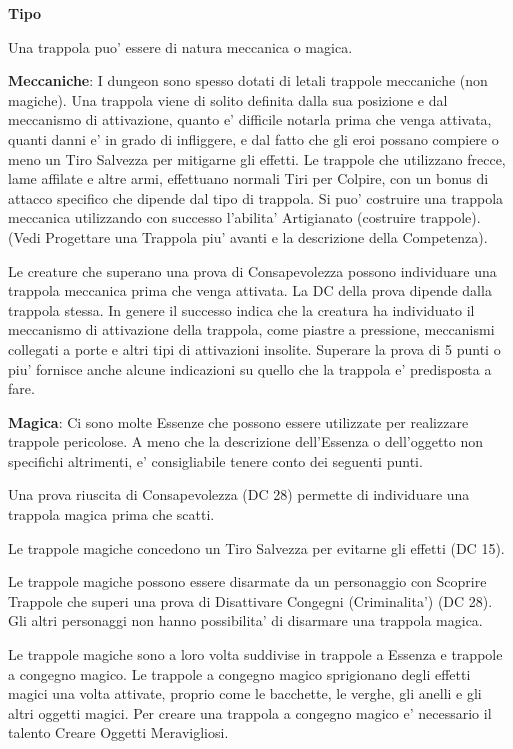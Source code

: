 \documentclass[a4paper,11pt,twoside,openany]{dndbook}
\begin{document}
{\textbf{Tipo}

Una trappola puo' essere di natura meccanica o magica.

\textbf{Meccaniche}: I dungeon sono spesso dotati di letali trappole meccaniche (non magiche). Una trappola viene di solito definita dalla sua posizione e dal meccanismo di attivazione, quanto e' difficile notarla prima che venga attivata, quanti danni e' in grado di infliggere, e dal fatto che gli eroi possano compiere o meno un Tiro Salvezza per mitigarne gli effetti. Le trappole che utilizzano frecce, lame affilate e altre armi, effettuano normali Tiri per Colpire, con un bonus di attacco specifico che dipende dal tipo di trappola. Si puo' costruire una trappola meccanica utilizzando con successo l'abilita' Artigianato (costruire trappole). (Vedi Progettare una Trappola piu' avanti e la descrizione della Competenza).

Le creature che superano una prova di Consapevolezza possono individuare una trappola meccanica prima che venga attivata. La DC della prova dipende dalla trappola stessa. In genere il successo indica che la creatura ha individuato il meccanismo di attivazione della trappola, come piastre a pressione, meccanismi collegati a porte e altri tipi di attivazioni insolite. Superare la prova di 5 punti o piu' fornisce anche alcune indicazioni su quello che la trappola e' predisposta a fare.

\textbf{Magica}: Ci sono molte Essenze che possono essere utilizzate per realizzare trappole pericolose. A meno che la descrizione dell'Essenza o dell'oggetto non specifichi altrimenti, e' consigliabile tenere conto dei seguenti punti.

Una prova riuscita di Consapevolezza (DC 28) permette di individuare una trappola magica prima che scatti.

Le trappole magiche concedono un Tiro Salvezza per evitarne gli effetti (DC 15).

Le trappole magiche possono essere disarmate da un personaggio con Scoprire Trappole che superi una prova di Disattivare Congegni (Criminalita') (DC 28). Gli altri personaggi non hanno possibilita' di disarmare una trappola magica.

Le trappole magiche sono a loro volta suddivise in trappole a Essenza e trappole a congegno magico. Le trappole a congegno magico sprigionano degli effetti magici una volta attivate, proprio come le bacchette, le verghe, gli anelli e gli altri oggetti magici. Per creare una trappola a congegno magico e' necessario il talento Creare Oggetti Meravigliosi. 

}
\end{document}
